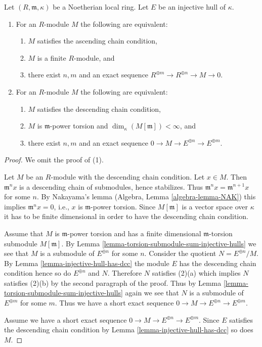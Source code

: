 \begin{lemma}
\label{lemma-describe-categories}
Let $(R, \mathfrak m, \kappa)$ be a Noetherian local ring.
Let $E$ be an injective hull of $\kappa$.
\begin{enumerate}
\item For an $R$-module $M$ the following are equivalent:
\begin{enumerate}
\item $M$ satisfies the ascending chain condition,
\item $M$ is a finite $R$-module, and
\item there exist $n, m$ and an exact sequence
$R^{\oplus m} \to R^{\oplus n} \to M \to 0$.
\end{enumerate}
\item For an $R$-module $M$ the following are equivalent:
\begin{enumerate}
\item $M$ satisfies the descending chain condition,
\item $M$ is $\mathfrak m$-power torsion and
$\dim_\kappa(M[\mathfrak m]) < \infty$, and
\item there exist $n, m$ and an exact sequence
$0 \to M \to E^{\oplus n} \to E^{\oplus m}$.
\end{enumerate}
\end{enumerate}
\end{lemma}

\begin{proof}
We omit the proof of (1).

\medskip\noindent
Let $M$ be an $R$-module with the descending chain condition. Let $x \in M$.
Then $\mathfrak m^n x$ is a descending chain of submodules, hence stabilizes.
Thus $\mathfrak m^nx = \mathfrak m^{n + 1}x$ for some $n$. By Nakayama's lemma
(Algebra, Lemma \ref{algebra-lemma-NAK}) this implies $\mathfrak m^n x = 0$,
i.e., $x$ is $\mathfrak m$-power torsion. Since $M[\mathfrak m]$ is a vector
space over $\kappa$ it has to be finite dimensional in order to have the
descending chain condition.

\medskip\noindent
Assume that $M$ is $\mathfrak m$-power torsion and has a finite dimensional
$\mathfrak m$-torsion submodule $M[\mathfrak m]$. By
Lemma \ref{lemma-torsion-submodule-sum-injective-hulls}
we see that $M$ is a submodule of $E^{\oplus n}$ for some $n$.
Consider the quotient $N = E^{\oplus n}/M$. By
Lemma \ref{lemma-injective-hull-has-dcc} the module $E$ has the
descending chain condition hence so do $E^{\oplus n}$ and $N$.
Therefore $N$ satisfies (2)(a) which implies $N$ satisfies
(2)(b) by the second paragraph of the proof. Thus by
Lemma \ref{lemma-torsion-submodule-sum-injective-hulls}
again we see that $N$ is a submodule of $E^{\oplus m}$ for some $m$.
Thus we have a short exact sequence
$0 \to M \to E^{\oplus n} \to E^{\oplus m}$.

\medskip\noindent
Assume we have a short exact sequence
$0 \to M \to E^{\oplus n} \to E^{\oplus m}$.
Since $E$ satisfies the descending chain condition by
Lemma \ref{lemma-injective-hull-has-dcc}
so does $M$.
\end{proof}

